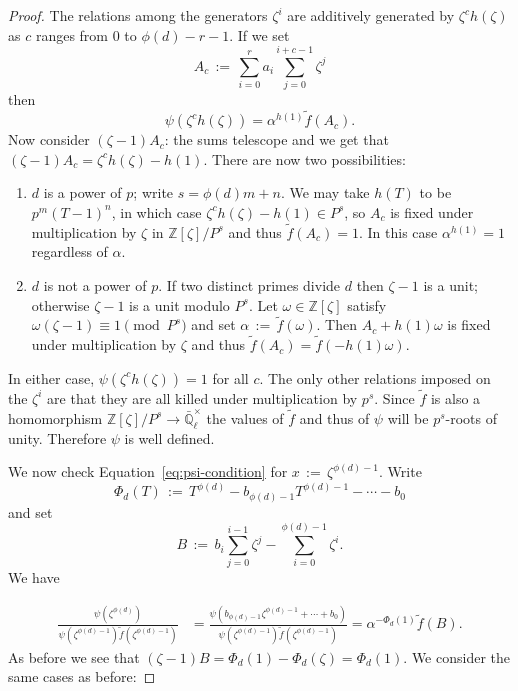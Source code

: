 \documentclass[11pt]{amsart}
\theoremstyle{plain}
\theoremstyle{definition}
\theoremstyle{remark}
\newcommand{\ZZ}{{\mathbb{Z}}}
\newcommand{\EE}{\mathbb{\bar Q}_\ell}
\newcommand{\EEx}{\EE^\times}
\newcommand{\ceq}{{\, :=\, }}
\begin{document}
\begin{proof}
  The relations among the generators $\zeta^i$ are additively
  generated by $\zeta^ch(\zeta)$ as $c$ ranges from $0$ to
  $\phi(d)-r-1$.  If we set
  \[
  A_c \ceq \sum_{i=0}^r a_i \sum_{j=0}^{i+c-1} \zeta^j
  \]
  then
  \[
  \psi(\zeta^ch(\zeta)) = \alpha^{h(1)} \tilde{f}(A_c).
  \]
  Now consider $(\zeta - 1)A_c$: the sums telescope and we get that
  $(\zeta-1)A_c = \zeta^ch(\zeta) - h(1).$ There are now two
  possibilities:
  \begin{enumerate}
  \item $d$ is a power of $p$; write $s = \phi(d)m + n$.  We may take
    $h(T)$ to be $p^m(T-1)^n$, in which case $\zeta^ch(\zeta) - h(1) \in P^s$,
    so $A_c$ is fixed under multiplication by $\zeta$ in
    $\ZZ[\zeta]/P^s$ and thus $\tilde{f}(A_c) = 1$.  In this case
    $\alpha^{h(1)} = 1$ regardless of $\alpha$.
  \item $d$ is not a power of $p$.  If two distinct primes divide $d$
    then $\zeta - 1$ is a unit; otherwise $\zeta - 1$ is a unit modulo
    $P^s$.  Let $\omega \in \ZZ[\zeta]$ satisfy
    $\omega(\zeta - 1) \equiv 1 \pmod{P^s}$ and set
     $ \alpha \ceq \tilde{f}(\omega)$.
    Then $A_c + h(1)\omega$ is fixed under multiplication by $\zeta$
    and thus $\tilde{f}(A_c) = \tilde{f}(-h(1)\omega)$.
  \end{enumerate}
  In either case, $\psi(\zeta^ch(\zeta)) = 1$ for all $c$.  The only
  other relations imposed on the $\zeta^i$ are that they are all
  killed under multiplication by $p^s$.  Since $\tilde{f}$ is also a
  homomorphism $\ZZ[\zeta]/P^s \rightarrow \EEx$ the values of
  $\tilde{f}$ and thus of $\psi$ will be $p^s$-roots of unity.
  Therefore $\psi$ is well defined.

  We now check Equation~\eqref{eq:psi-condition} for
  $x \ceq \zeta^{\phi(d)-1}$.  Write
  \[\Phi_d(T) \ceq T^{\phi(d)} - b_{\phi(d)-1}T^{\phi(d)-1} - \cdots - b_0\]
  and set
  \[
  B \ceq b_i \sum_{j=0}^{i-1} \zeta^j -  \sum_{i=0}^{\phi(d)-1} \zeta^i.
  \]
  We have

  \begin{align*}
    \frac{\psi(\zeta^{\phi(d)})}{\psi(\zeta^{\phi(d)-1})\tilde{f}(\zeta^{\phi(d)-1})}
    &= \frac{\psi(b_{\phi(d)-1}\zeta^{\phi(d)-1} + \cdots + b_0)}{\psi(\zeta^{\phi(d)-1})\tilde{f}(\zeta^{\phi(d)-1})} 
    = \alpha^{-\Phi_d(1)} \tilde{f}(B).
  \end{align*}
  As before we see that $(\zeta - 1)B = \Phi_d(1) - \Phi_d(\zeta) = \Phi_d(1)$.
  We consider the same cases as before:


\end{proof}
\end{document}
